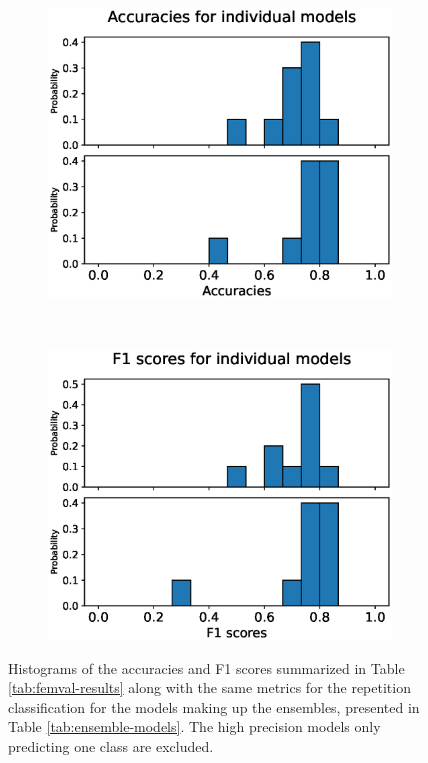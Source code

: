 \begin{figure}
  \begin{subfigure}[t]{0.4\textwidth}
    \includegraphics[width=\textwidth]{files/figs/res/femval/acc-ind.eps}
    \caption{}
    \label{fig:femval-acc-ind}
  \end{subfigure}
  ~
  \begin{subfigure}[t]{0.4\textwidth}
    \includegraphics[width=\textwidth]{files/figs/res/femval/f1-ind.eps}
    \caption{}
    \label{fig:femval-f1-ind}
  \end{subfigure}
  \caption{Histograms of the accuracies and F1 scores summarized in Table \ref{tab:femval-results} along with the same metrics for the repetition classification for the models making up the ensembles, presented in Table \ref{tab:ensemble-models}. The high precision models only predicting one class are excluded.}
  \label{fig:femval-hist-results}
\end{figure}


